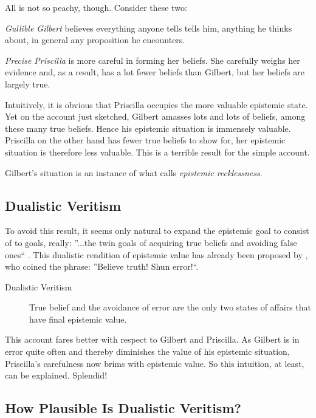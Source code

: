 \documentclass[12pt,numbers=noenddot]{scrartcl}
\begin{document}
All is not so peachy, though. Consider these two:

\emph{Gullible Gilbert} believes everything anyone tells tells him, anything he thinks about, in general any proposition he encounters.

\emph{Precise Priscilla} is more careful in forming her beliefs. She carefully weighs her evidence and, as a result, has a lot fewer beliefs than Gilbert, but her beliefs are largely true.

Intuitively, it is obvious that Priscilla occupies the more valuable epistemic state. Yet on the account just sketched, Gilbert amasses lots and lots of beliefs, among these many true beliefs. Hence his epistemic situation is immensely valuable. Priscilla on the other hand has fewer true beliefs to show for, her epistemic situation is therefore less valuable. This is a terrible result for the simple account.

Gilbert’s situation is an instance of what \textcite[360]{Berker2013-BERETA-2} calls \emph{epistemic recklessness}. 

\subsection{Dualistic Veritism}

To avoid this result, it seems only natural to expand the epistemic goal to consist of to goals, really: ”...the twin goals of acquiring true beliefs and avoiding false ones“ \parencite[339]{Berker2013-BERETA-2}. This dualistic rendition of epistemic value has already been proposed by \textcite[17]{James1896-JAMTWT-19}, who coined the phrase: ”Believe truth! Shun error!“.

\begin{description}
    \item[Dualistic Veritism] True belief and the avoidance of error are the only two states of affairs that have final epistemic value.
\end{description}

This account fares better with respect to Gilbert and Priscilla. As Gilbert is in error quite often and thereby diminishes the value of his epistemic situation, Priscilla’s carefulness now brims with epistemic value. So this intuition, at least, can be explained. Splendid!

\subsection{How Plausible Is Dualistic Veritism?}
\end{document}
